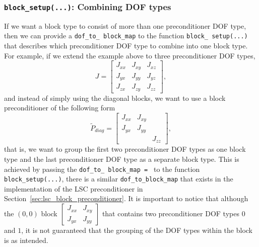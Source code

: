 \subsubsection{\texttt{block\_setup(...)}: Combining DOF types\label{sec:block_setup_combining_dof_types}}
If we want a block type to consist of more than one preconditioner DOF type,
then we can provide a \texttt{dof\_\allowbreak to\_\allowbreak
  block\_\allowbreak map} to the function \texttt{block\_\allowbreak
  setup(...)} that describes which preconditioner DOF type to combine into one block type. For example, if we extend the
example above to three preconditioner DOF types,
\begin{equation*}
J =
\begin{bmatrix}
J_{xx}&J_{xy}&J_{xz} \\
J_{yx}&J_{yy}&J_{yz} \\
J_{zx}&J_{zy}&J_{zz}
\end{bmatrix},
\end{equation*}
and instead of simply using the diagonal blocks, we want to use a block
preconditioner of the following form
\begin{equation*}
\tilde{P}_{diag} =
\begin{bmatrix}
J_{xx}&J_{xy}&       \\
J_{yx}&J_{yy}&       \\
      &      &J_{zz}
\end{bmatrix},
\end{equation*}
that is, we want to group the first two preconditioner DOF types as one block
type and the last preconditioner DOF type as a separate block type. This is
achieved by passing the \texttt{dof\_\allowbreak to\_\allowbreak
  block\_\allowbreak map \allowbreak = \allowbreak [0 0 1]} to the function
\texttt{block\_\allowbreak setup(...)}, there is a similar
\texttt{dof\_\allowbreak to\_\allowbreak block\_\allowbreak map} that exists in
the implementation of the LSC preconditioner in
Section~\ref{sec:lsc_block_preconditioner}. It is important to notice that
although the $(0,0)$ block 
$\displaystyle
\begin{bmatrix}
J_{xx}&J_{xy} \\
J_{yx}&J_{yy} 
\end{bmatrix}
$
that contains two preconditioner DOF types $0$ and $1$, it is not guaranteed
that the grouping of the DOF types within the block is as intended.
